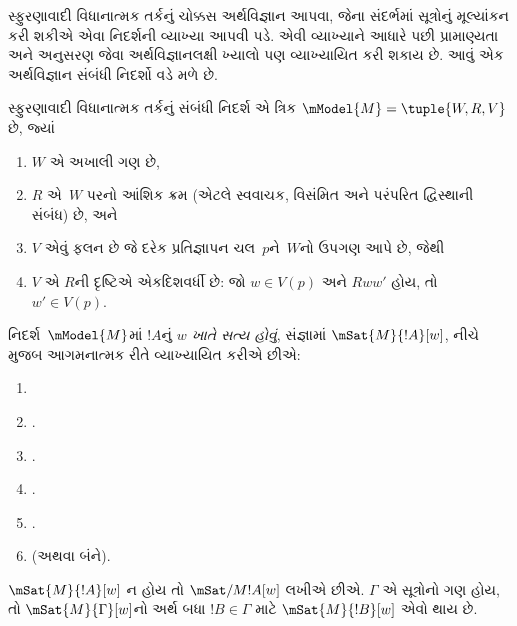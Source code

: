 \begingroup
\makeatletter{}\makeatother


\label{guunit:OLP-0500}


સ્ફુરણાવાદી વિધાનાત્મક તર્કનું ચોક્કસ અર્થવિજ્ઞાન આપવા,
જેના સંદર્ભમાં સૂત્રોનું મૂલ્યાંકન કરી શકીએ એવા
નિદર્શની વ્યાખ્યા આપવી પડે. એવી વ્યાખ્યાને આધારે પછી
પ્રામાણ્યતા અને અનુસરણ જેવા અર્થવિજ્ઞાનલક્ષી ખ્યાલો પણ
વ્યાખ્યાયિત કરી શકાય છે. આવું એક અર્થવિજ્ઞાન
સંબંધી નિદર્શો વડે મળે છે.

\begin{defn}
  સ્ફુરણાવાદી વિધાનાત્મક તર્કનું સંબંધી નિદર્શ
  એ ત્રિક $\mModel{M} = \tuple{W, R, V}$ છે, જ્યાં
  \begin{enumerate}
  \item $W$ એ અખાલી ગણ છે,
  \item $R$ એ~$W$ પરનો આંશિક ક્રમ (એટલે સ્વવાચક, વિસંમિત
    અને પરંપરિત દ્વિસ્થાની સંબંધ) છે, અને
  \item $V$ એવું ફલન છે જે દરેક પ્રતિજ્ઞાપન ચલ~$p$ને~$W$નો ઉપગણ આપે છે, જેથી
  \item $V$ એ $R$ની દૃષ્ટિએ એકદિશવર્ધી છે: જો $w
    \in V(p)$ અને $Rww'$ હોય, તો $w' \in V(p)$.
  \end{enumerate}
\end{defn}

\begin{defn}
  નિદર્શ~$\mModel{M}$માં $!A$નું \emph{$w$ ખાતે સત્ય
    હોવું}, સંજ્ઞામાં $\mSat{M}{!A}[w]$, નીચે મુજબ
  આગમનાત્મક રીતે વ્યાખ્યાયિત કરીએ છીએ:
  \begin{enumerate}
  \item {}
  \item {}.
  \item {}.
  \item {}.
  \item {}.
  \item {} (અથવા બંને).
  \end{enumerate}
  $\mSat{M}{!A}[w]$ ન હોય તો $\mSat/{M}{!A}[w]$ લખીએ છીએ.
  $\Gamma$ એ સૂત્રોનો ગણ હોય, તો
  $\mSat{M}{\Gamma}[w]$નો અર્થ બધા $!B \in \Gamma$
  માટે $\mSat{M}{!B}[w]$ એવો થાય છે.
\end{defn}

